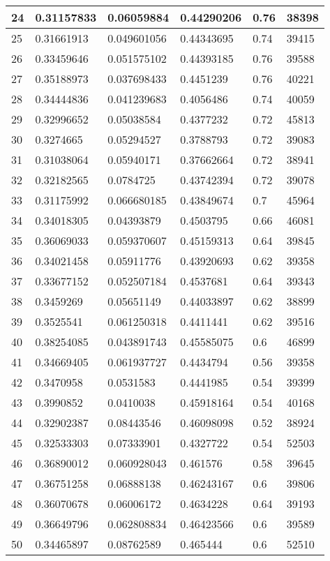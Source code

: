\begin{longtable}{|l|l|l|l|l|l|}
24 & 0.31157833 & 0.06059884 & 0.44290206 & 0.76 & 38398 \\ \hline 
25 & 0.31661913 & 0.049601056 & 0.44343695 & 0.74 & 39415 \\ \hline 
26 & 0.33459646 & 0.051575102 & 0.44393185 & 0.76 & 39588 \\ \hline 
27 & 0.35188973 & 0.037698433 & 0.4451239 & 0.76 & 40221 \\ \hline 
28 & 0.34444836 & 0.041239683 & 0.4056486 & 0.74 & 40059 \\ \hline 
29 & 0.32996652 & 0.05038584 & 0.4377232 & 0.72 & 45813 \\ \hline 
30 & 0.3274665 & 0.05294527 & 0.3788793 & 0.72 & 39083 \\ \hline 
31 & 0.31038064 & 0.05940171 & 0.37662664 & 0.72 & 38941 \\ \hline 
32 & 0.32182565 & 0.0784725 & 0.43742394 & 0.72 & 39078 \\ \hline 
33 & 0.31175992 & 0.066680185 & 0.43849674 & 0.7 & 45964 \\ \hline 
34 & 0.34018305 & 0.04393879 & 0.4503795 & 0.66 & 46081 \\ \hline 
35 & 0.36069033 & 0.059370607 & 0.45159313 & 0.64 & 39845 \\ \hline 
36 & 0.34021458 & 0.05911776 & 0.43920693 & 0.62 & 39358 \\ \hline 
37 & 0.33677152 & 0.052507184 & 0.4537681 & 0.64 & 39343 \\ \hline 
38 & 0.3459269 & 0.05651149 & 0.44033897 & 0.62 & 38899 \\ \hline 
39 & 0.3525541 & 0.061250318 & 0.4411441 & 0.62 & 39516 \\ \hline 
40 & 0.38254085 & 0.043891743 & 0.45585075 & 0.6 & 46899 \\ \hline 
41 & 0.34669405 & 0.061937727 & 0.4434794 & 0.56 & 39358 \\ \hline 
42 & 0.3470958 & 0.0531583 & 0.4441985 & 0.54 & 39399 \\ \hline 
43 & 0.3990852 & 0.0410038 & 0.45918164 & 0.54 & 40168 \\ \hline 
44 & 0.32902387 & 0.08443546 & 0.46098098 & 0.52 & 38924 \\ \hline 
45 & 0.32533303 & 0.07333901 & 0.4327722 & 0.54 & 52503 \\ \hline 
46 & 0.36890012 & 0.060928043 & 0.461576 & 0.58 & 39645 \\ \hline 
47 & 0.36751258 & 0.06888138 & 0.46243167 & 0.6 & 39806 \\ \hline 
48 & 0.36070678 & 0.06006172 & 0.4634228 & 0.64 & 39193 \\ \hline 
49 & 0.36649796 & 0.062808834 & 0.46423566 & 0.6 & 39589 \\ \hline 
50 & 0.34465897 & 0.08762589 & 0.465444 & 0.6 & 52510 \\ \hline 
\end{longtable}